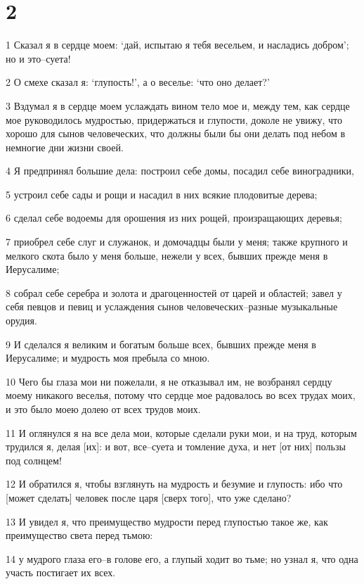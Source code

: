 \chapter{2}

\par 1 Сказал я в сердце моем: `дай, испытаю я тебя весельем, и насладись добром'; но и это--суета!
\par 2 О смехе сказал я: `глупость!', а о веселье: `что оно делает?'
\par 3 Вздумал я в сердце моем услаждать вином тело мое и, между тем, как сердце мое руководилось мудростью, придержаться и глупости, доколе не увижу, что хорошо для сынов человеческих, что должны были бы они делать под небом в немногие дни жизни своей.
\par 4 Я предпринял большие дела: построил себе домы, посадил себе виноградники,
\par 5 устроил себе сады и рощи и насадил в них всякие плодовитые дерева;
\par 6 сделал себе водоемы для орошения из них рощей, произращающих деревья;
\par 7 приобрел себе слуг и служанок, и домочадцы были у меня; также крупного и мелкого скота было у меня больше, нежели у всех, бывших прежде меня в Иерусалиме;
\par 8 собрал себе серебра и золота и драгоценностей от царей и областей; завел у себя певцов и певиц и услаждения сынов человеческих--разные музыкальные орудия.
\par 9 И сделался я великим и богатым больше всех, бывших прежде меня в Иерусалиме; и мудрость моя пребыла со мною.
\par 10 Чего бы глаза мои ни пожелали, я не отказывал им, не возбранял сердцу моему никакого веселья, потому что сердце мое радовалось во всех трудах моих, и это было моею долею от всех трудов моих.
\par 11 И оглянулся я на все дела мои, которые сделали руки мои, и на труд, которым трудился я, делая [их]: и вот, все--суета и томление духа, и нет [от них] пользы под солнцем!
\par 12 И обратился я, чтобы взглянуть на мудрость и безумие и глупость: ибо что [может сделать] человек после царя [сверх того], что уже сделано?
\par 13 И увидел я, что преимущество мудрости перед глупостью такое же, как преимущество света перед тьмою:
\par 14 у мудрого глаза его--в голове его, а глупый ходит во тьме; но узнал я, что одна участь постигает их всех.
